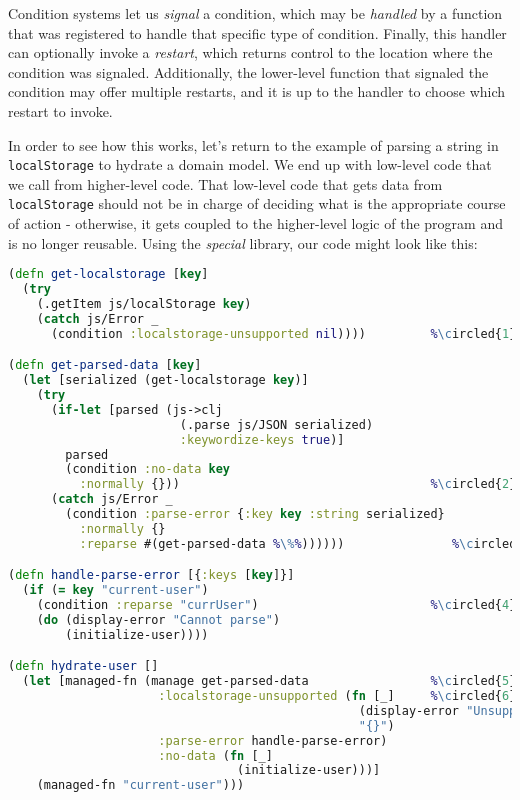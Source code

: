 \documentclass[10pt,twoside,openright]{memoir}
\newcommand*\circled[1]{\tikz[baseline=(char.base)]{
            \node[shape=circle,draw,inner sep=1pt] (char) {#1};}}
\begin{document}
Condition systems let us \emph{signal} a condition, which may be
\emph{handled} by a function that was registered to handle that specific
type of condition. Finally, this handler can optionally invoke a
\emph{restart}, which returns control to the location where the
condition was signaled. Additionally, the lower-level function that
signaled the condition may offer multiple restarts, and it is up to the
handler to choose which restart to invoke.

In order to see how this works, let's return to the example of parsing a
string in \texttt{localStorage} to hydrate a domain model. We end up
with low-level code that we call from higher-level code. That low-level
code that gets data from \texttt{localStorage} should not be in charge
of deciding what is the appropriate course of action - otherwise, it
gets coupled to the higher-level logic of the program and is no longer
reusable. Using the \emph{special} library, our code might look like
this:

\begin{lstlisting}[language=Clojure, caption={Handling conditions}]
(defn get-localstorage [key]
  (try
    (.getItem js/localStorage key)
    (catch js/Error _
      (condition :localstorage-unsupported nil))))         %\circled{1}%

(defn get-parsed-data [key]
  (let [serialized (get-localstorage key)]
    (try
      (if-let [parsed (js->clj
                        (.parse js/JSON serialized)
                        :keywordize-keys true)]
        parsed
        (condition :no-data key
          :normally {}))                                   %\circled{2}%
      (catch js/Error _
        (condition :parse-error {:key key :string serialized}
          :normally {}
          :reparse #(get-parsed-data %\%%))))))               %\circled{3}%

(defn handle-parse-error [{:keys [key]}]
  (if (= key "current-user")
    (condition :reparse "currUser")                        %\circled{4}%
    (do (display-error "Cannot parse")
        (initialize-user))))

(defn hydrate-user []
  (let [managed-fn (manage get-parsed-data                 %\circled{5}%
                     :localstorage-unsupported (fn [_]     %\circled{6}%
                                                 (display-error "Unsupported")
                                                 "{}")
                     :parse-error handle-parse-error)
                     :no-data (fn [_]
                                (initialize-user)))]
    (managed-fn "current-user")))
\end{lstlisting}
\end{document}

